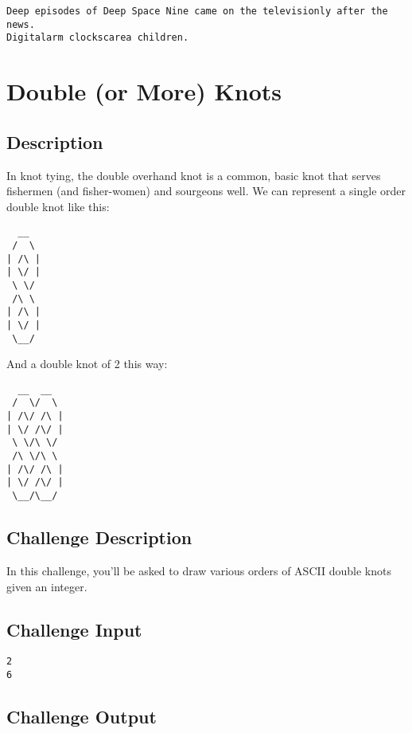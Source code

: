 \begin{lstlisting}
Deep episodes of Deep Space Nine came on the televisionly after the news.
Digitalarm clockscarea children.
\end{lstlisting}


\section{Double (or More) Knots}

\subsection*{Description}\label{description-22}

In knot tying, the double overhand knot is a common, basic knot that
serves fishermen (and fisher-women) and sourgeons well. We can represent
a single order double knot like this:

\begin{lstlisting}
  __
 /  \
| /\ |
| \/ |
 \ \/
 /\ \
| /\ |
| \/ |
 \__/
\end{lstlisting}

And a double knot of 2 this way:

\begin{lstlisting}
  __  __ 
 /  \/  \
| /\/ /\ |
| \/ /\/ |
 \ \/\ \/
 /\ \/\ \
| /\/ /\ |
| \/ /\/ |
 \__/\__/
\end{lstlisting}

\subsection*{Challenge Description}\label{challenge-description-1}

In this challenge, you'll be asked to draw various orders of ASCII
double knots given an integer.

\subsection*{Challenge Input}\label{challenge-input-16}

\begin{lstlisting}
2
6
\end{lstlisting}

\subsection*{Challenge Output}\label{challenge-output-13}

